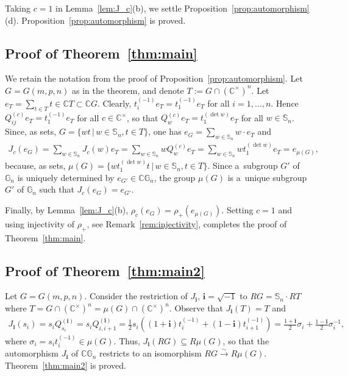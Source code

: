 \documentclass[11pt]{article}
\newcommand{\g}[1]{t_{#1}^{(-1)}}
\begin{document}
Taking $c=1$ in Lemma~\ref{lem:J_c}(b), we settle Proposition~\ref{prop:automorphism}(d).
Proposition~\ref{prop:automorphism} is proved.


\subsection*{Proof of Theorem~\ref{thm:main}} We retain the notation from the proof of
Proposition~\ref{prop:automorphism}.
Let $G=G(m,p,n)$ as in the theorem, and denote $T:=G\cap (\mathbb C^\times)^n$.
Let $e_T=\sum\limits_{t\in T}t\in \mathbb C T\subset \mathbb C G$.
Clearly, $\g ie_T=\g 1e_T$ for all $i=1,\ldots,n$.
Hence $Q_{ij}^{(c)}e_T=\g1e_T$ for all $c\in\mathbb C^\times$, so that $Q_w^{(c)}e_T=t_1^{(\det w)}e_T$ for all $w\in
\mathbb S_n$.
Since, as sets, $G=\{wt \,|\, w\in \mathbb S_n, t\in T\}$, one has $e_G=\sum\limits_{w\in\mathbb S_n}w\cdot e_T$ and
\begin{gather*}
J_c(e_G)= \sum\limits_{w\in \mathbb S_n} J_c(w)e_T = \sum\limits_{w\in \mathbb S_n} wQ_w^{(c)}e_T =\sum\limits_{w\in
\mathbb S_n} wt_1^{(\det w)}e_T = e_{\mu(G)},
\end{gather*}
because, as sets, $\mu(G)=\big\{wt_1^{(\det w)} t \,|\, w\in \mathbb S_n, t\in T\big\}$.
Since a~subgroup $G'$ of $\mathbb G_n$ is uniquely determined by $e_{G'}\in\mathbb C \mathbb G_n$, the group $\mu(G)$ is
a~unique subgroup $G'$ of $\mathbb G_n$ such that $J_c(e_G)=e_{G'}$.

Finally, by Lemma~\ref{lem:J_c}(b), $\rho_c(e_G)=\rho_+(e_{\mu(G)})$.
Setting $c=1$ and using injectivity of $\rho_+$, see Remark~\ref{rem:injectivity}, completes the proof of
Theorem~\ref{thm:main}.


\subsection*{Proof of Theorem~\ref{thm:main2}} Let $G=G(m,p,n)$.
Consider the restriction of $J_\mathbf{i}$, $\mathbf{i}=\sqrt{-1}$ to $R G=\mathbb S_n\cdot R T$ where $T=G\cap (\mathbb
C^\times)^n=\mu(G)\cap (\mathbb C^\times)^n$.
Observe that $J_\mathbf{i}(T)=T$ and
\begin{gather*}
J_\mathbf{i}(s_i)=s_iQ_{s_i}^{(\mathbf{i})}=s_i Q_{i,i+1}^{(\mathbf{i})}
=\frac12 s_i\left((1+\mathbf{i})t_i^{(-1)}+(1-\mathbf{i})t_{i+1}^{(-1)}\right)
=\frac{1+\mathbf{i}}{2}\sigma_i+\frac{1-\mathbf{i}}{2}\sigma_i^{-1},
\end{gather*}
where $\sigma_i=s_i t_i^{(-1)}\in \mu(G)$.
Thus, $J_\mathbf{i}(R G)\subseteq R\mu(G)$, so that the automorphism $J_\mathbf{i}$ of $\mathbb C \mathbb G_n$ restricts
to an isomorphism $R G \xrightarrow{\sim} R \mu(G)$.
Theorem~\ref{thm:main2} is proved.
\setcounter{section}{3}
\setcounter{subsection}{0}
\setcounter{subsubsection}{0}
\setcounter{Theorem}{11}
\setcounter{equation}{0}
\end{document}
